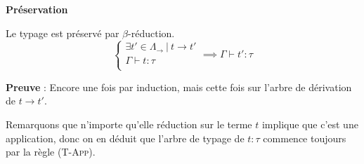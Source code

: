 \documentclass[11pt]{article}
\begin{document}
\begin{theorem}
    \textbf{Préservation}

    Le typage est préservé par $\beta$-réduction.
    $$\begin{cases}
        \exists t'\in\Lambda_\rightarrow~|~ t\longrightarrow t'\\
        \Gamma\vdash t:\tau\\
    \end{cases}\implies \Gamma\vdash t':\tau$$
\end{theorem}

\textbf{Preuve} : Encore une fois par induction, mais cette fois sur l'arbre de dérivation de $t\longrightarrow t'$.

Remarquons que n'importe qu'elle réduction sur le terme $t$ implique que c'est une application, donc on en déduit que l'arbre de typage de $t:\tau$ commence toujours par la règle ({\scshape{T-App}}).
\end{document}
